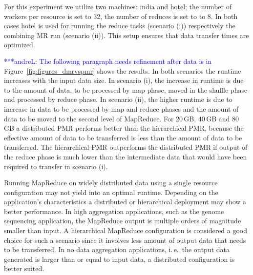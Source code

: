 \documentclass{acm_proc_article-sp}
\newcommand{\alnote}[1]{ {\textcolor{blue} { ***andreL: #1 }}}
\newcommand{\pnote}[1]{ {\textcolor{magenta} { ***pradeep: #1 }}}
\newcommand{\alnote}[1]{}
\newcommand{\pnote}[1]{}
\begin{document}
For this experiment we utilize two machines: india and hotel; the number of
workers per resource is set to 32, the number of reduces is set to to 8. In
both cases hotel is used for running the reduce tasks (scenario (i))
respectively the combining MR run (scenario (ii)). This setup ensures that
data transfer times are optimized.




\alnote{The following paragraph needs refinement after data is in}
Figure~\ref{fig:figures_dmrvspmr} shows the results. In both scenarios the
runtime increases with the input data size. In scenario (i), the increase in
runtime is due to the amount of data, to be processed by map phase, moved in
the shuffle phase and processed by reduce phase. In scenario (ii), the higher
runtime is due to increase in data to be processed by map and reduce phases
and the amount of data to be moved to the second level of MapReduce. For
20\,GB, 40\,GB and 80\,GB a distributed PMR performs better than the
hierarchical PMR, because the effective amount of data to be transferred is
less than the amount of data to be transferred. The hierarchical PMR 
outperforms the distributed PMR if output of the reduce phase is much lower 
than the intermediate data that would have been required to transfer in 
scenario (i).



Running MapReduce on widely distributed data using a single resource
configuration may not yield into an optimal runtime. Depending on the
application's characteristics a distributed or hierarchical deployment may show
a better performance. In high aggregation applications, such as the genome 
sequencing application, the MapReduce output is multiple orders of magnitude 
smaller than input. A hierarchical MapReduce configuration is considered a good 
choice for such a scenario since it involves less amount of output data that 
needs to be transferred. In no data aggregation applications, i.\,e.\ the 
output data generated is larger than or equal to input data, a distributed configuration is better suited. 
\end{document}
